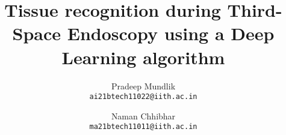 \documentclass[10pt, twocolumn, letterpaper]{article}
\title{Tissue recognition during Third-Space Endoscopy using a Deep Learning algorithm}
\author{
    Pradeep Mundlik \\
    {\tt\small ai21btech11022@iith.ac.in}
    \and
    Naman Chhibhar \\
    {\tt\small ma21btech11011@iith.ac.in}
}
\begin{document}
\maketitle
    


% 



{
    \small
    \nocite{*}
    
}

% 
\end{document}
